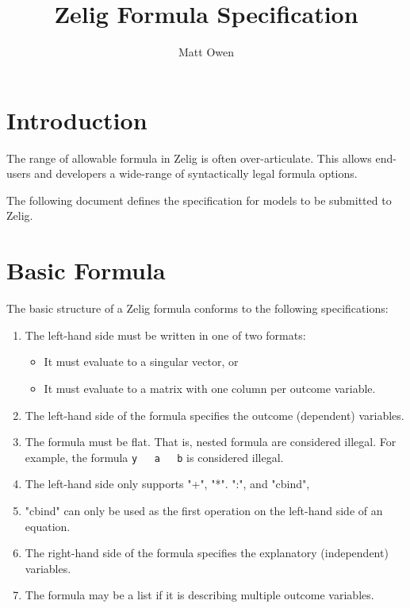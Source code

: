 \documentclass{article}
\title{Zelig Formula Specification}
\author{Matt Owen}
\begin{document}
\maketitle

\section{Introduction}

The range of allowable formula in Zelig is often over-articulate. This allows
end-users and developers a wide-range of syntactically legal formula options.

The following document defines the specification for models to be submitted to
Zelig.


\section{Basic Formula}

The basic structure of a Zelig formula conforms to the following specifications:

\begin{enumerate}
  \item The left-hand side must be written in one of two formats:
    \begin{itemize}
      \item It must evaluate to a singular vector, or
      \item It must evaluate to a matrix with one column per outcome variable.
    \end{itemize}
  \item The left-hand side of the formula specifies the outcome (dependent) variables.
  \item The formula must be flat. That is, nested formula are considered
    illegal. For example, the formula {\tt y ~ a ~ b} is considered illegal.
  \item The left-hand side only supports "+", "*". ":", and "cbind",
  \item "cbind" can only be used as the first operation on the left-hand side of an equation.
  \item The right-hand side of the formula specifies the explanatory (independent) variables.
  \item The formula may be a list if it is describing multiple outcome variables.
\end{enumerate}
\end{document}
